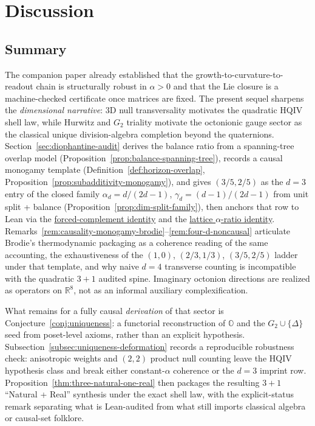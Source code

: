 \documentclass[11pt]{amsart}
\begin{document}
\section{Discussion}

\subsection{Summary}

The companion paper \cite{hqiv-so8-paper} already established that the growth-to-curvature-to-readout chain is structurally robust in \(\alpha>0\) and that the Lie closure is a machine-checked certificate once matrices are fixed. The present sequel sharpens the \emph{dimensional narrative}: \(3\)D null transversality motivates the quadratic HQIV shell law, while Hurwitz and \(G_2\) triality motivate the octonionic gauge sector as the classical unique division-algebra completion beyond the quaternions. Section~\ref{sec:diophantine-audit} derives the balance ratio from a spanning-tree overlap model (Proposition~\ref{prop:balance-spanning-tree}), records a causal monogamy template (Definition~\ref{def:horizon-overlap}, Proposition~\ref{prop:subadditivity-monogamy}), and gives \((3/5,2/5)\) as the \(d=3\) entry of the closed family \(\alpha_d=d/(2d-1)\), \(\gamma_d=(d-1)/(2d-1)\) from unit split + balance (Proposition~\ref{prop:dim-split-family}), then anchors that row to Lean via the \hyperref[lean:gamma-complement]{forced-complement identity} and the \hyperref[lean:lattice-ratio]{lattice \(\alpha\)-ratio identity}. Remarks~\ref{rem:causality-monogamy-brodie}--\ref{rem:four-d-noncausal} articulate Brodie's thermodynamic packaging as a coherence reading of the same accounting, the exhaustiveness of the \((1,0)\), \((2/3,1/3)\), \((3/5,2/5)\) ladder under that template, and why naive \(d=4\) transverse counting is incompatible with the quadratic \(3+1\) audited spine. Imaginary octonion directions are realized as operators on \(\mathbb{R}^8\), not as an informal auxiliary complexification.

What remains for a fully causal \emph{derivation} of that sector is Conjecture~\ref{conj:uniqueness}: a functorial reconstruction of \(\mathbb{O}\) and the \(G_2\cup\{\Delta\}\) seed from poset-level axioms, rather than an explicit hypothesis. Subsection~\ref{subsec:uniqueness-deformation} records a reproducible robustness check: anisotropic weights and \((2,2)\) product null counting leave the HQIV hypothesis class and break either constant-\(\alpha\) coherence or the \(d=3\) imprint row. Proposition~\ref{thm:three-natural-one-real} then packages the resulting \(3{+}1\) ``Natural + Real'' synthesis under the exact shell law, with the explicit-status remark separating what is Lean-audited from what still imports classical algebra or causal-set folklore.
\end{document}
